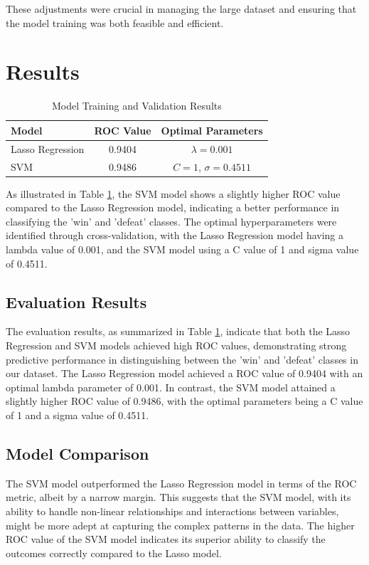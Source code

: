 \documentclass[12pt]{article}
\begin{document}
These adjustments were crucial in managing the large dataset and ensuring that the model training was both feasible and efficient.

\section{Results}
\label{sec:resu}

\begin{table}[ht]
	\centering
	\caption{Model Training and Validation Results}
	\label{table:training_results}
	\begin{tabular}{lcc}
		\hline
		\textbf{Model} & \textbf{ROC Value} & \textbf{Optimal Parameters} \\
		\hline
		Lasso Regression & 0.9404 & $\lambda = 0.001$ \\
		SVM & 0.9486 & $C = 1$, $\sigma = 0.4511$ \\
		\hline
	\end{tabular}
\end{table}

As illustrated in Table \ref{table:training_results}, the SVM model shows a slightly higher ROC value compared to the Lasso Regression model, indicating a better performance in classifying the 'win' and 'defeat' classes. The optimal hyperparameters were identified through cross-validation, with the Lasso Regression model having a lambda value of 0.001, and the SVM model using a C value of 1 and sigma value of 0.4511.

\subsection{Evaluation Results}
The evaluation results, as summarized in Table \ref{table:training_results}, indicate that both the Lasso Regression and SVM models achieved high ROC values, demonstrating strong predictive performance in distinguishing between the 'win' and 'defeat' classes in our dataset. The Lasso Regression model achieved a ROC value of 0.9404 with an optimal lambda parameter of 0.001. In contrast, the SVM model attained a slightly higher ROC value of 0.9486, with the optimal parameters being a C value of 1 and a sigma value of 0.4511.

\subsection{Model Comparison}
The SVM model outperformed the Lasso Regression model in terms of the ROC metric, albeit by a narrow margin. This suggests that the SVM model, with its ability to handle non-linear relationships and interactions between variables, might be more adept at capturing the complex patterns in the data. The higher ROC value of the SVM model indicates its superior ability to classify the outcomes correctly compared to the Lasso model.
\end{document}
